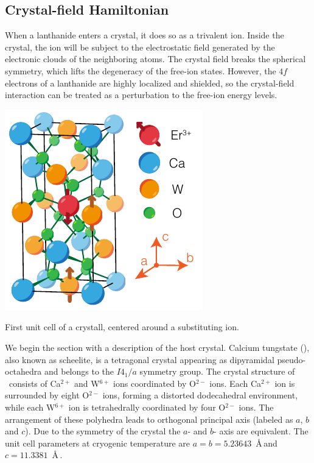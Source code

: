 \subsection{Crystal-field Hamiltonian}
When a lanthanide enters a crystal, it does so as a trivalent ion. Inside the crystal, the ion will be subject to the electrostatic field generated by the electronic clouds of the neighboring atoms. The crystal field breaks the spherical symmetry, which lifts the degeneracy of the free-ion states. However, the $4f$ electrons of a lanthanide are highly localized and shielded, so the crystal-field interaction can be treated as a perturbation to the free-ion energy levels. 

\begin{marginfigure}
    \includegraphics{chapter2/figures/crystal.pdf}
    \caption[\Ca crystal]{First unit cell of a \Ca crystall, centered around a substituting \Er ion.}
\end{marginfigure}

We begin the section with a description of the host crystal. Calcium tungstate (\Ca), also known as scheelite, is a tetragonal crystal appearing as dipyramidal pseudo-octahedra and belongs to the $I4_1/a$ symmetry group. The crystal structure of \Ca\ consists of Ca$^{2+}$ and W$^{6+}$ ions coordinated by O$^{2-}$ ions. Each Ca$^{2+}$ ion is surrounded by eight O$^{2-}$ ions, forming a distorted dodecahedral environment, while each W$^{6+}$ ion is tetrahedrally coordinated by four O$^{2-}$ ions. The arrangement of these polyhedra leads to orthogonal principal axis (labeled as $a$, $b$ and $c$). Due to the symmetry of the crystal the $a$- and $b$- axis are equivalent. The unit cell parameters at cryogenic temperature are $a=b=5.23643$~\AA\,and $c=11.3381$~\AA\,. 

